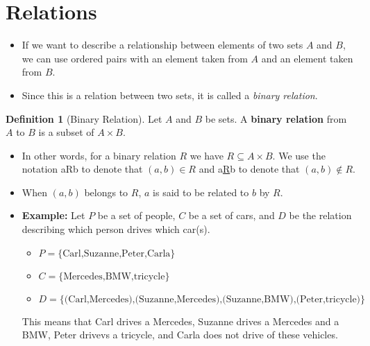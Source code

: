 \documentclass{article}
\theoremstyle{definition}
\newtheorem{definition}{Definition}[section]
\begin{document}
\section{Relations}
\begin{itemize}
    \item If we want to describe a relationship between elements of two sets $A$ and $B$,
        we can use ordered pairs with an element taken from $A$ and an element taken from $B$.
    \item Since this is a relation between two sets, it is called a \emph{binary relation}.
\end{itemize}
\begin{definition}[Binary Relation] Let $A$ and $B$ be sets. A \textbf{binary relation} from $A$ to
    $B$ is a subset of $A \times B$.
\end{definition}
\begin{itemize}
    \item In other words, for a binary relation $R$ we have $R \subseteq A \times B$.
        We use the notation aRb to denote that $(a,b) \in R$ and a\underline{R}b to denote
        that $(a,b) \notin R$.
    \item When $(a,b)$ belongs to $R$, $a$ is said to be related to $b$ by $R$.
    \item \textbf{Example:} Let $P$ be a set of people, $C$ be a set of cars, and $D$
        be the relation describing which person drives which car(s).
        \begin{itemize}
            \item $P = \text{\{Carl,Suzanne,Peter,Carla\}}$ 
            \item $C = \text{\{Mercedes,BMW,tricycle\}}$ 
            \item $D = \text{\{(Carl,Mercedes),(Suzanne,Mercedes),(Suzanne,BMW),(Peter,tricycle)\}}$
        \end{itemize}
        This means that Carl drives a Mercedes, Suzanne drives a Mercedes and a BMW, Peter
        drivevs a tricycle, and Carla does not drive of these vehicles.
\end{itemize}
\end{document}
